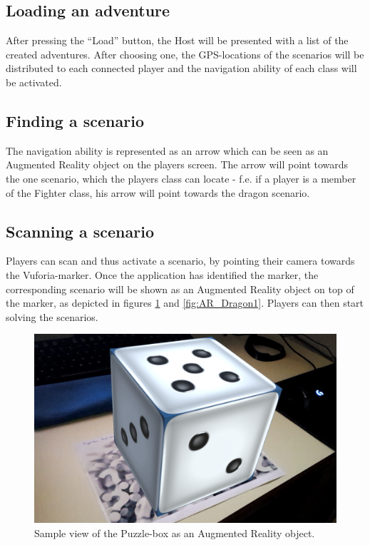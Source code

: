 \documentclass{sigchi-ext}
\begin{document}
\subsection{Loading an adventure}

After pressing the ``Load'' button, the Host will be presented with a list of the created adventures. After choosing one, the GPS-locations of the scenarios will be distributed to each connected player and the navigation ability of each class will be activated.

\subsection{Finding a scenario}

The navigation ability is represented as an arrow which can be seen as an Augmented Reality object on the players screen. The arrow will point towards the one scenario, which the players class can locate - f.e. if a player is a member of the Fighter class, his arrow will point towards the dragon scenario.

\subsection{Scanning a scenario}

Players can scan and thus activate a scenario, by pointing their camera towards the Vuforia-marker. Once the application has identified the marker, the corresponding scenario will be shown as an Augmented Reality object on top of the marker, as depicted in figures \ref{fig:AR_Box1} and \ref{fig:AR_Dragon1}. Players can then start solving the scenarios.

\begin{figure}
	\centering
	\includegraphics[width=1\columnwidth]{figures/PM_AR_Box}
	\caption{Sample view of the Puzzle-box as an Augmented Reality object.}\label{fig:AR_Box1}
\end{figure}
\end{document}
